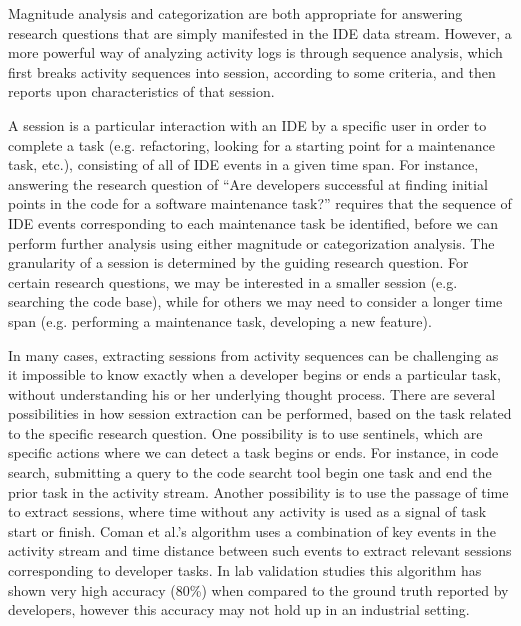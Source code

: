 Magnitude analysis and categorization are both appropriate for answering research questions that are simply manifested in the IDE data stream. However, a more powerful way of analyzing activity logs is through sequence analysis, which first breaks activity sequences into session, according to some criteria, and then reports upon characteristics of that session. 

A session is a particular interaction with an IDE by a specific user in order to complete a task (e.g. refactoring, looking for a starting point for a maintenance task, etc.), consisting of all of IDE events in a given time span.
For instance, answering the research question of ``Are developers successful at finding initial points in the code for a software maintenance task?'' requires that the sequence of IDE events corresponding to each maintenance task be identified, before we can perform further analysis using either magnitude or categorization analysis. The granularity of a session is determined by the guiding research question. For certain research questions, we may be interested in a smaller session (e.g. searching the code base), while for others we may need to consider a longer time span (e.g. performing a maintenance task, developing a new feature). 

In many cases, extracting sessions from activity sequences can be challenging as it impossible to know exactly when a developer begins or ends a particular task, without understanding his or her underlying thought process. There are several possibilities in how session extraction can be performed, based on the task related to the specific research question. One possibility is to use sentinels, which are specific actions where we can detect a task begins or ends. For instance, in code search, submitting a query to the code searcht tool begin one task and end the prior task in the activity stream. Another possibility is to use the passage of time to extract sessions, where time without any activity is used as a signal of task start or finish. Coman et al.'s \cite{Coman-TaskIdent} algorithm uses a combination of key events in the activity stream and time distance between such events to extract relevant sessions corresponding to developer tasks. In lab validation studies this algorithm has shown very high accuracy (80\%) when compared to the ground truth reported by developers, however this accuracy may not hold up in an industrial setting\cite{Zou-ComanIndustry}.


